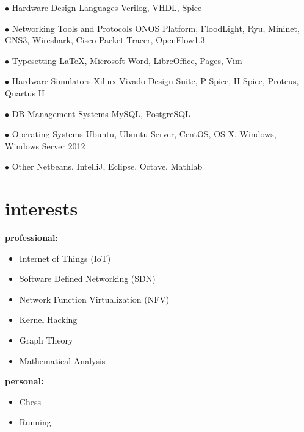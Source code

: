 \documentclass[]{friggeri-cv} %
\begin{document}
\begin{entrylist}

\entry
{$\bullet$}
{Hardware Design Languages}
{}
{Verilog, VHDL, Spice}


\entry
{$\bullet$}
{Networking Tools and Protocols}
{}
{ONOS Platform, FloodLight, Ryu, Mininet, GNS3, Wireshark, Cisco Packet Tracer, OpenFlow1.3}


\entry
{$\bullet$}
{Typesetting}
{}
{\LaTeX, Microsoft Word, LibreOffice, Pages, Vim}


\entry
{$\bullet$}
{Hardware Simulators}
{}
{Xilinx Vivado Design Suite, P-Spice, H-Spice, Proteus, Quartus II}


\entry
{$\bullet$}
{DB Management Systems}
{}
{MySQL, PostgreSQL}


\entry
{$\bullet$}
{Operating Systems}
{}
{Ubuntu, Ubuntu Server, CentOS, OS X, Windows, Windows Server 2012}


\entry
{$\bullet$}
{Other}
{}
{Netbeans, IntelliJ, Eclipse, Octave, Mathlab}


\end{entrylist}


\section{interests}
\textbf{professional:}
\begin{itemize}
	\item Internet of Things (IoT)
	\item Software Defined Networking (SDN)
	\item Network Function Virtualization (NFV)
	\item Kernel Hacking
	\item Graph Theory
	\item Mathematical Analysis
\end{itemize}
\textbf{personal:}
\begin{itemize}	
	\item Chess
	\item Running
\end{itemize}
\end{document}

